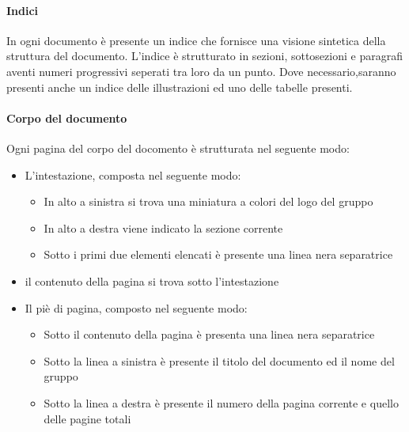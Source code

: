 \paragraph{Indici}     

In ogni documento è presente un indice che fornisce una visione sintetica della struttura del documento. L'indice è strutturato in sezioni, sottosezioni e paragrafi aventi numeri progressivi seperati tra loro da un punto.\newline
Dove necessario,saranno presenti anche un indice delle illustrazioni ed uno delle tabelle presenti.

\paragraph{Corpo del documento}       

Ogni pagina del corpo del docomento è strutturata nel seguente modo:

\begin{itemize}

	\item L'intestazione, composta nel seguente modo:
	
	\begin{itemize}

		\item In alto a sinistra si trova una miniatura a colori del logo del gruppo
	
		\item In alto a destra viene indicato la sezione corrente
	
		\item Sotto i primi due elementi elencati è presente una 	linea nera separatrice

	\end{itemize}
		
	\item il contenuto della pagina si trova sotto l'intestazione
	
	\item Il piè di pagina, composto nel seguente modo:
	
	\begin{itemize}
	
		\item Sotto il contenuto della pagina è presenta una linea nera separatrice
	
		\item Sotto la linea a sinistra è presente il titolo del documento ed il nome del gruppo
		
		\item Sotto la linea a destra è presente il numero della pagina corrente e quello delle pagine totali
		
	\end{itemize}

\end{itemize}

